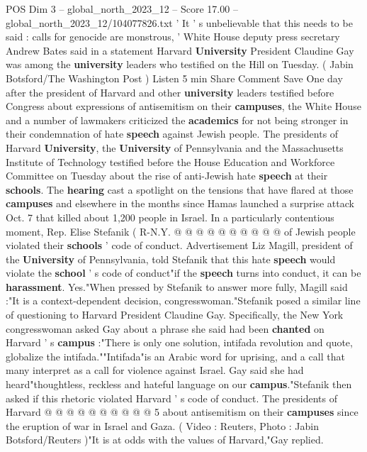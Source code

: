 \begin{textsample}{POS Dim 3 – global\_north\_2023\_12 – Score 17.00 – global\_north\_2023\_12/104077826.txt}  \label{ex:f3_pos_219}
' It ' s unbelievable that this needs to be said : calls for genocide are monstrous, ' White House deputy press secretary Andrew Bates said in a statement Harvard \textbf{University} President Claudine Gay was among the \textbf{university} leaders who testified on the Hill on Tuesday. ( Jabin Botsford/The Washington Post ) Listen 5 min Share Comment Save One day after the president of Harvard and other \textbf{university} leaders testified before Congress about expressions of antisemitism on their \textbf{campuses}, the White House and a number of lawmakers criticized the \textbf{academics} for not being stronger in their condemnation of hate \textbf{speech} against Jewish people.
The presidents of Harvard \textbf{University}, the \textbf{University} of Pennsylvania and the Massachusetts Institute of Technology testified before the House Education and Workforce Committee on Tuesday about the rise of anti-Jewish hate \textbf{speech} at their \textbf{schools}.
The \textbf{hearing} cast a spotlight on the tensions that have flared at those \textbf{campuses} and elsewhere in the months since Hamas launched a surprise attack Oct. 7 that killed about 1,200 people in Israel.
In a particularly contentious moment, Rep.
Elise Stefanik ( R-N.Y. @ @ @ @ @ @ @ @ @ @ of Jewish people violated their \textbf{schools} ' code of conduct.
Advertisement Liz Magill, president of the \textbf{University} of Pennsylvania, told Stefanik that this hate \textbf{speech} would violate the \textbf{school} ' s code of conduct"if the \textbf{speech} turns into conduct, it can be \textbf{harassment}.
Yes."When pressed by Stefanik to answer more fully, Magill said :"It is a context-dependent decision, congresswoman."Stefanik posed a similar line of questioning to Harvard President Claudine Gay.
Specifically, the New York congresswoman asked Gay about a phrase she said had been \textbf{chanted} on Harvard ' s \textbf{campus} :"There is only one solution, intifada revolution and quote, globalize the intifada.""Intifada"is an Arabic word for uprising, and a call that many interpret as a call for violence against Israel.
Gay said she had heard"thoughtless, reckless and hateful language on our \textbf{campus}."Stefanik then asked if this rhetoric violated Harvard ' s code of conduct.
The presidents of Harvard @ @ @ @ @ @ @ @ @ @ 5 about antisemitism on their \textbf{campuses} since the eruption of war in Israel and Gaza. ( Video : Reuters, Photo : Jabin Botsford/Reuters )"It is at odds with the values of Harvard,"Gay replied.

\end{textsample}
